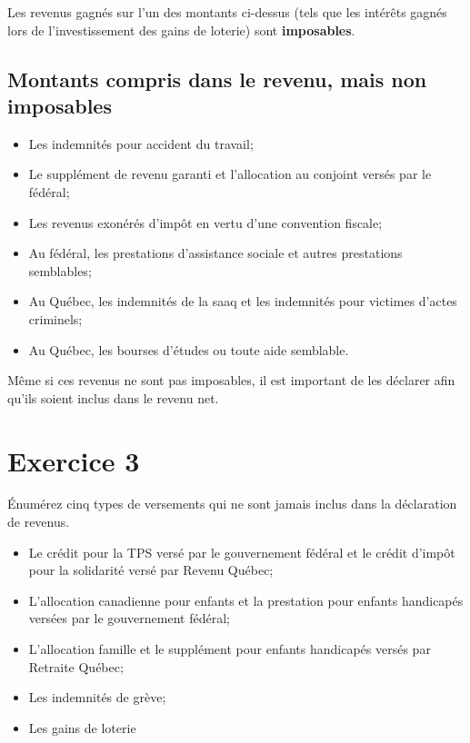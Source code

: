 \begin{note}
	Les revenus gagnés sur l'un des montants ci-dessus (tels que les intérêts gagnés lors de l'investissement des gains de loterie) sont \textbf{imposables}.
\end{note}


\subsection{Montants compris dans le revenu, mais non imposables}
\begin{itemize}
	\item Les indemnités pour accident du travail;
	\item Le supplément de revenu garanti et l'allocation au conjoint versés par le fédéral;
	\item Les revenus exonérés d'impôt en vertu d'une convention fiscale;
	\item Au fédéral, les prestations d'assistance sociale et autres prestations semblables;
	\item Au Québec, les indemnités de la \acrfull{saaq} et les indemnités pour victimes d'actes criminels;
	\item Au Québec, les bourses d'études ou toute aide semblable.
\end{itemize}
\begin{note}
	Même si ces revenus ne sont pas imposables, il est important de les déclarer afin qu'ils soient inclus dans le revenu net.
\end{note}



\section{Exercice 3}
\setcounter{question}{0}
\begin{question}
	Énumérez cinq types de versements qui ne sont jamais inclus dans la déclaration de revenus.
\end{question}
\begin{itemize}
	\item Le crédit pour la TPS versé par le gouvernement fédéral et le crédit d'impôt pour la solidarité versé par Revenu Québec;
	\item L'allocation canadienne pour enfants et la prestation pour enfants handicapés versées par le gouvernement fédéral;
	\item L'allocation famille et le supplément pour enfants handicapés versés par Retraite Québec;
	\item Les indemnités de grève;
	\item Les gains de loterie
\end{itemize}

